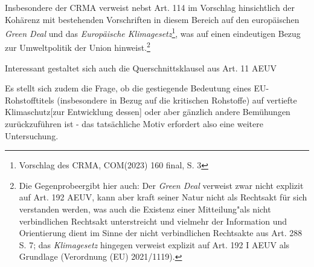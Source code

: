 \documentclass[12pt,a4paper,oneside]{book} %
\begin{document}
	
	
	Insbesondere der CRMA verweist nebst Art. 114 im Vorschlag hinsichtlich der Kohärenz mit bestehenden Vorschriften in diesem Bereich auf den europäischen \textit{Green Deal} und das \textit{Europäische Klimagesetz}\footnote{Vorschlag des CRMA, COM(2023) 160 final, S. 3}, was auf einen eindeutigen Bezug zur Umweltpolitik der Union hinweist.\footnote{Die \glqq Gegenprobe\grqq ergibt hier auch: Der \textit{Green Deal} verweist zwar nicht explizit auf Art. 192 AEUV, kann aber kraft seiner Natur nicht als Rechtsakt für sich verstanden werden, was auch die Existenz einer \glqq Mitteilung"\grqq als nicht verbindlichen Rechtsakt unterstreicht und vielmehr der Information und Orientierung dient im Sinne der nicht verbindlichen Rechtsakte aus Art. 288 S. 7; das \textit{Klimagesetz} hingegen verweist explizit auf Art. 192 I AEUV als Grundlage (Verordnung (EU) 2021/1119).}
	
	Interessant gestaltet sich auch die Querschnittsklausel aus Art. 11 AEUV
	
	Es stellt sich zudem die Frage, ob die gestiegende Bedeutung eines EU-Rohstofftitels (insbesondere in Bezug auf die kritischen Rohstoffe) auf vertiefte Klimaschutz[zur Entwicklung dessen]\autocite{Gundel in Tehobald/Kühling, IV, Energieumweltrecht, Rn. 74ff.} oder aber gänzlich andere Bemühungen zurückzuführen ist - das tatsächliche Motiv erfordert also eine weitere Untersuchung.
	
	
	
	
\end{document}
